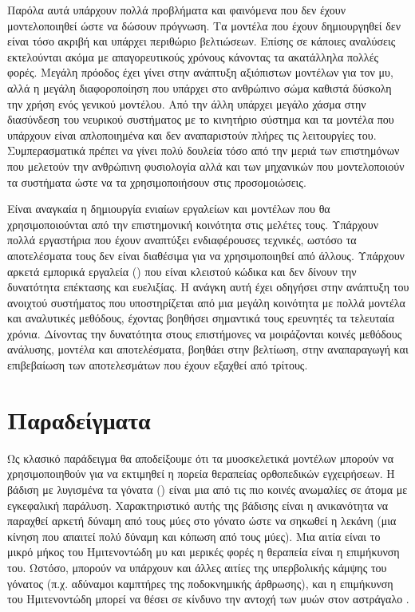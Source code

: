 Παρόλα αυτά υπάρχουν πολλά προβλήματα και φαινόμενα που δεν έχουν μοντελοποιηθεί ώστε να δώσουν πρόγνωση. Τα μοντέλα που έχουν δημιουργηθεί δεν είναι τόσο ακριβή και υπάρχει περιθώριο βελτιώσεων. Επίσης σε κάποιες αναλύσεις εκτελούνται ακόμα με απαγορευτικούς χρόνους κάνοντας τα ακατάλληλα πολλές φορές. Μεγάλη πρόοδος έχει γίνει στην ανάπτυξη αξιόπιστων μοντέλων για τον μυ, αλλά η μεγάλη διαφοροποίηση που υπάρχει στο ανθρώπινο σώμα καθιστά δύσκολη την χρήση ενός γενικού μοντέλου. Από την άλλη υπάρχει μεγάλο χάσμα στην διασύνδεση του νευρικού συστήματος με το κινητήριο σύστημα και τα μοντέλα που υπάρχουν είναι απλοποιημένα και δεν αναπαριστούν πλήρες τις λειτουργίες του. Συμπερασματικά πρέπει να γίνει πολύ δουλεία τόσο από την μεριά των επιστημόνων που μελετούν την ανθρώπινη φυσιολογία αλλά και των μηχανικών που μοντελοποιούν τα συστήματα ώστε να τα χρησιμοποιήσουν στις προσομοιώσεις.

Είναι αναγκαία η δημιουργία ενιαίων εργαλείων και μοντέλων που θα χρησιμοποιούνται από την επιστημονική κοινότητα στις μελέτες τους. Υπάρχουν πολλά εργαστήρια που έχουν αναπτύξει ενδιαφέρουσες τεχνικές, ωστόσο τα αποτελέσματα τους δεν είναι διαθέσιμα για να χρησιμοποιηθεί από άλλους. Υπάρχουν αρκετά εμπορικά εργαλεία () που είναι κλειστού κώδικα και δεν δίνουν την δυνατότητα επέκτασης και ευελιξίας. Η ανάγκη αυτή έχει οδηγήσει στην ανάπτυξη του ανοιχτού συστήματος  που υποστηρίζεται από μια μεγάλη κοινότητα με πολλά μοντέλα και αναλυτικές μεθόδους, έχοντας βοηθήσει σημαντικά τους ερευνητές τα τελευταία χρόνια. Δίνοντας την δυνατότητα στους επιστήμονες να μοιράζονται κοινές μεθόδους ανάλυσης, μοντέλα και αποτελέσματα, βοηθάει στην βελτίωση, στην αναπαραγωγή και επιβεβαίωση των αποτελεσμάτων που έχουν εξαχθεί από τρίτους.

\section*{Παραδείγματα}

Ως κλασικό παράδειγμα θα αποδείξουμε ότι τα μυοσκελετικά μοντέλων μπορούν να χρησιμοποιηθούν για να εκτιμηθεί η πορεία θεραπείας ορθοπεδικών εγχειρήσεων. Η βάδιση με λυγισμένα τα γόνατα () είναι μια από τις πιο κοινές ανωμαλίες σε άτομα με εγκεφαλική παράλυση. Χαρακτηριστικό αυτής της βάδισης είναι η ανικανότητα να παραχθεί αρκετή δύναμη από τους μύες στο γόνατο ώστε να σηκωθεί η λεκάνη (μια κίνηση που απαιτεί πολύ δύναμη και κόπωση από τους μύες).  Μια αιτία είναι το μικρό μήκος του Ημιτενοντώδη μυ και μερικές φορές η θεραπεία είναι η επιμήκυνση του. Ωστόσο, μπορούν να υπάρχουν και άλλες αιτίες της υπερβολικής κάμψης του γόνατος (π.χ. αδύναμοι καμπτήρες της ποδοκνημικής άρθρωσης), και η επιμήκυνση του Ημιτενοντώδη μπορεί να θέσει σε κίνδυνο την αντοχή των μυών στον αστράγαλο \cite{arnolda06}.

